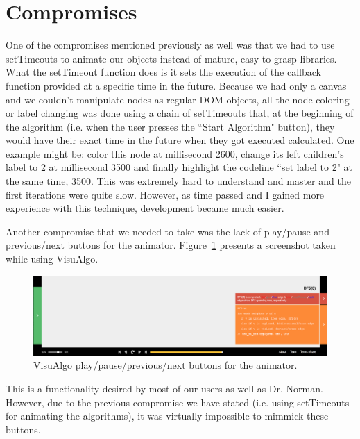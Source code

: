 \documentclass{l4proj}
\begin{document}
\section{Compromises}

One of the compromises mentioned previously as well was that we had to use setTimeouts to animate our objects instead
of mature, easy-to-grasp libraries. What the setTimeout function does is it sets the execution of the callback function
provided at a specific time in the future. Because we had only a canvas and we couldn't manipulate nodes as regular DOM
objects, all the node coloring or label changing was done using a chain of setTimeouts that, at the beginning of the
algorithm (i.e. when the user presses the ``Start Algorithm" button), they would have their exact time in the future
when they got executed calculated. One example might be: color this node at millisecond 2600, change its left
children's label to 2 at millisecond 3500 and finally highlight the codeline ``set label to 2" at the same time, 3500.
This was extremely hard to understand and master and the first iterations were quite slow. However, as time passed and
I gained more experience with this technique, development became much easier.

Another compromise that we needed to take was the lack of play/pause and previous/next buttons for the animator.
Figure~\ref{fig:play-pause-previous-next} presents a screenshot taken while using VisuAlgo.

\begin{figure}[!ht]
    \centering
    \includegraphics[scale=0.35]{play-pause-previous-next}
    \caption{VisuAlgo play/pause/previous/next buttons for the animator.}
    \label{fig:play-pause-previous-next}
\end{figure}

This is a functionality desired by most of our users as well as Dr. Norman. However, due to the previous compromise we
have stated (i.e. using setTimeouts for animating the algorithms), it was virtually impossible to mimmick these
buttons.

\end{document}
